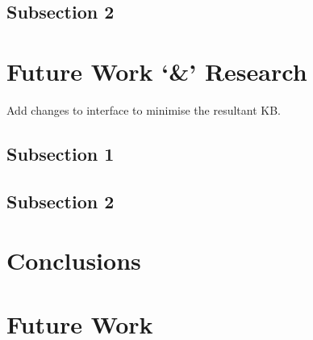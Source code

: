 
\subsection{Subsection 2}




\section{Future Work `\&' Research}

Add changes to interface to minimise the resultant KB.
\subsection{Subsection 1}




\subsection{Subsection 2}





\section{Conclusions}

\section{Future Work}


